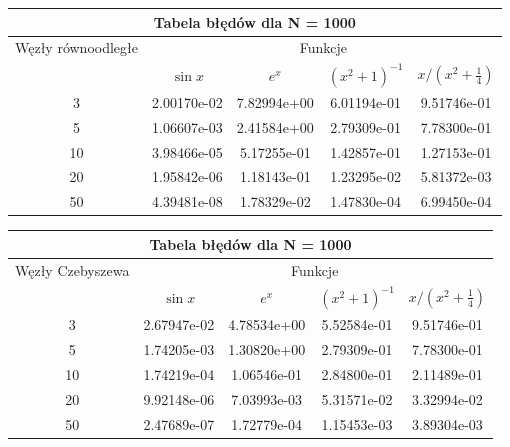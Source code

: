\documentclass{article}
\begin{document}
\renewcommand{\arraystretch}{1.5}  
\begin{center}
	\begin{tabular}{||c||c|c|c|c||} \hline
		\multicolumn{5}{||c||}{Tabela błędów dla N = 1000} \\ \hline
		Węzły równoodległe 	& \multicolumn{4}{|c||}{Funkcje} \\ \cline{2-5}
		& $\sin x$ & $e^x$ & $(x^{2}+1)^{-1}$ & $x/(x^{2} + \frac{1}{4})$ \\ \hline					
		3 		& 2.00170e-02 &  7.82994e+00 &  6.01194e-01 & 9.51746e-01 \\ \hline
		5 		& 1.06607e-03 &  2.41584e+00 &  2.79309e-01 & 7.78300e-01 \\ \hline
		10  	& 3.98466e-05 &  5.17255e-01 &  1.42857e-01 & 1.27153e-01 \\ \hline
		20  	& 1.95842e-06 &  1.18143e-01 &  1.23295e-02 & 5.81372e-03 \\ \hline
		50  	& 4.39481e-08 &  1.78329e-02 &  1.47830e-04 & 6.99450e-04 \\ \hline
	\end{tabular}
\end{center}
\renewcommand{\arraystretch}{1}

\renewcommand{\arraystretch}{1.5}  
\begin{center}
	\begin{tabular}{||c||c|c|c|c||} \hline
		\multicolumn{5}{||c||}{Tabela błędów dla N = 1000} \\ \hline
		Węzły Czebyszewa 	& \multicolumn{4}{|c||}{Funkcje} \\ \cline{2-5}
		& $\sin x$ & $e^x$ & $(x^{2}+1)^{-1}$ & $x/(x^{2} + \frac{1}{4})$ \\ \hline					
		3 		& 2.67947e-02 &  4.78534e+00 &  5.52584e-01 & 9.51746e-01 \\ \hline
		5 		& 1.74205e-03 &  1.30820e+00 &  2.79309e-01 & 7.78300e-01 \\ \hline
		10  	& 1.74219e-04 &  1.06546e-01 &  2.84800e-01 & 2.11489e-01 \\ \hline
		20  	& 9.92148e-06 &  7.03993e-03 &  5.31571e-02 & 3.32994e-02 \\ \hline
		50  	& 2.47689e-07 &  1.72779e-04 &  1.15453e-03 & 3.89304e-03 \\ \hline
	\end{tabular}
\end{center}
\renewcommand{\arraystretch}{1}
\end{document}
